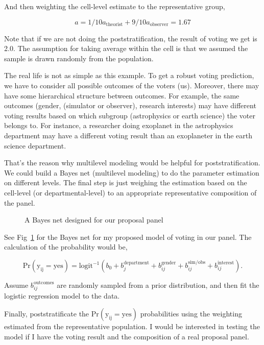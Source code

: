 \documentclass[12pt,letterpaper]{article}
\begin{document}
And then weighting the cell-level estimate to the representative group, 

\begin{equation*}
    a = 1 / 10 a_{\mathrm{theorist}} + 9 / 10 a_{\mathrm{observer}} = 1.67
\end{equation*}

Note that if we are not doing the poststratification, the result of voting we get is 2.0.
The assumption for taking average within the cell is that we assumed the sample is drawn randomly from the population.

The real life is not as simple as this example. 
To get a robust voting prediction, we have to consider all possible outcomes of the voters (us).
Moreover, there may have some hierarchical structure between outcomes. 
For example, the same outcomes (gender, (simulator or observer), research interests) may have different voting results based on which subgroup (astrophysics or earth science) the voter belongs to.
For instance, a researcher doing exoplanet in the astrophysics department may have a different voting result than an exoplaneter in the earth science department.

That's the reason why multilevel modeling would be helpful for poststratification. 
We could build a Bayes net (multilevel modeling) to do the parameter estimation on different levels.
The final step is just weighing the estimation based on the cell-level (or departmental-level) to an appropriate representative composition of the panel.

\begin{figure}
    \begin{center}
                
    \end{center}
    \caption{A Bayes net designed for our proposal panel}
    \label{fig:bayes_net_mrp}
\end{figure}

See Fig~\ref{fig:bayes_net_mrp} for the Bayes net for my proposed model of voting in our panel.
The calculation of the probability would be, 

\begin{equation}
    \mathrm{Pr(y_{ij} = yes)} = \mathrm{logit^{-1}}(
        b_0 + b_j^{\mathrm{department}} + b_{ij}^{\mathrm{gender}}
        + b_{ij}^{\mathrm{sim/obs}} + b_{ij}^{\mathrm{interest}}
    ).
\end{equation}

Assume $b_{ij}^{\mathrm{outcomes}}$ are randomly sampled from a prior distribution,
and then fit the logistic regression model to the data.

Finally, poststratificate the $\mathrm{Pr(y_{ij} = yes)}$ probabilities using the 
weighting estimated from the representative population.
I would be interested in testing the model if I have the voting result and the composition of a real proposal panel.
\end{document}
